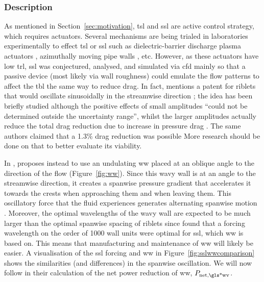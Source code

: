\subsubsection{Description}
As mentioned in Section~\ref{sec:motivation}, \gls*{tsl} and \gls*{ssl} are active control strategy, which requires actuators. Several mechanisms are being trialed in laboratories experimentally to effect \gls*{tsl} or \gls*{ssl} such as dielectric-barrier discharge plasma actuators \cite{choi2011}, azimuthally moving pipe walls \cite{auteri2010}, etc. However, as these actuators have low \gls*{trl}, \gls*{ssl} was conjectured, analysed, and simulated via \gls*{cfd} mainly so that a passive device (most likely via wall roughness) could emulate the flow patterns to affect the \gls*{tbl} the same way to reduce drag. In fact, \textcite{viotti2009} mentions a patent for riblets that would oscillate sinusoidally in the streamwise direction \cite{quadrio2008}; the idea has been briefly studied although the positive effects of small amplitudes ``could not be determined outside the uncertainty range'', whilst the larger amplitudes actually reduce the total drag reduction due to increase in pressure drag \cite{kramer2010}. The same authors claimed that a 1.3\% drag reduction was possible \cite{gruneberger2012}  More research should be done on that to better evaluate its viability.

In \cite{chernyshenko2013}, \citeauthor{chernyshenko2013} proposes instead to use an undulating \gls*{ww} placed at an oblique angle to the direction of the flow (Figure~\ref{fig:ww}). Since this wavy wall is at an angle to the streamwise direction, it creates a spanwise pressure gradient that accelerates it towards the crests when approaching them and when leaving them. This oscillatory force that the fluid experiences generates alternating spanwise motion \cite{ghebali2017}. Moreover, the optimal wavelengths of the wavy wall are expected to be much larger than the optimal spanwise spacing of riblets since \textcite{viotti2009} found that a forcing wavelength on the order of 1000 wall units were optimal for \gls*{ssl}, which \gls*{ww} is based on. This means that manufacturing and maintenance of \gls*{ww} will likely be easier. A visualisation of the \gls*{ssl} forcing and \gls*{ww} in Figure~\ref{fig:sslwwcomparison} shows the similarities (and differences) in the spanwise oscillation. We will now follow \textcite{chernyshenko2013} in their calculation of the net power reduction of \gls*{ww}, $P_\text{net,\gls*{wv}} $.

